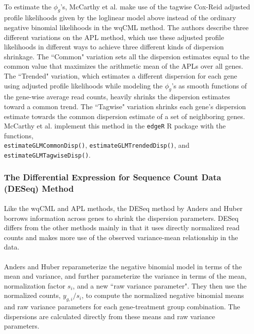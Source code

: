 \documentclass[10pt]{article}
\begin{document}
\paragraph{} \indent To estimate the $\phi_g$'s, McCarthy et al. \cite{mcarthy} make use of the tagwise Cox-Reid adjusted profile likelihoods given by the loglinear model above instead of the ordinary negative binomial likelihoods in the wqCML method. The authors describe three different variations on the APL method, which use these adjusted profile likelihoods in different ways to achieve three different kinds of dispersion shrinkage. The ``Common" variation sets all the dispersion estimates equal to the common value that maximizes the arithmetic mean of the APLs over all genes. The ``Trended" variation, which estimates a different dispersion for each gene using adjusted profile likelihoods while modeling the $\phi_g$'s as smooth functions of the gene-wise average read counts, heavily shrinks the dispersion estimates toward a common trend. The ``Tagwise" variation shrinks each gene's dispersion estimate towards the common dispersion estimate of a set of neighboring genes. McCarthy et al. \cite{mcarthy} implement this method in the {\tt edgeR} R package with the functions, \\ {\tt estimateGLMCommonDisp()}, {\tt estimateGLMTrendedDisp()}, and {\tt estimateGLMTagwiseDisp()}.

\subsubsection*{The Differential Expression for Sequence Count Data (DESeq) Method} \label{subsec:deseq}

\paragraph{} \indent Like the wqCML and APL methods, the DESeq method by Anders and Huber \cite{deseq} borrows information across genes to shrink the dispersion parameters. DESeq differs from the other methods mainly in that it uses directly normalized read counts and makes more use of the observed variance-mean relationship in the data.

\paragraph{} \indent Anders and Huber \cite{deseq} reparameterize the negative binomial model in terms of the mean and variance, and further parameterize the variance in terms of the mean, normalization factor $s_i$, and a new ``raw variance parameter". They then use the normalized counts, $y_{g, i}/s_i$, to compute the normalized negative binomial means and raw variance parameters for each gene-treatment group combination. The dispersions are calculated directly from these means and raw variance parameters.
\end{document}
